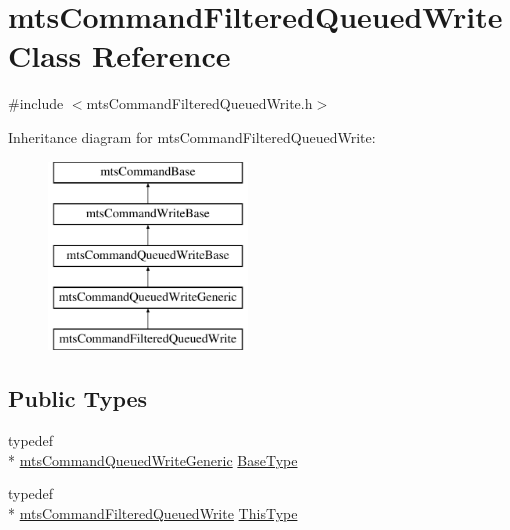 \hypertarget{classmts_command_filtered_queued_write}{\section{mts\-Command\-Filtered\-Queued\-Write Class Reference}
\label{classmts_command_filtered_queued_write}
}


{\ttfamily \#include $<$mts\-Command\-Filtered\-Queued\-Write.\-h$>$}

Inheritance diagram for mts\-Command\-Filtered\-Queued\-Write\-:\begin{figure}[H]
\begin{center}
\leavevmode
\includegraphics[height=5.000000cm]{d9/d52/classmts_command_filtered_queued_write}
\end{center}
\end{figure}
\subsection*{Public Types}
\begin{DoxyCompactItemize}
\item 
typedef \\*
\hyperlink{classmts_command_queued_write_generic}{mts\-Command\-Queued\-Write\-Generic} \hyperlink{classmts_command_filtered_queued_write_af9539c71a0b5815f2206641041dfdd60}{Base\-Type}
\item 
typedef \\*
\hyperlink{classmts_command_filtered_queued_write}{mts\-Command\-Filtered\-Queued\-Write} \hyperlink{classmts_command_filtered_queued_write_a155aa724cca736441779aaa34b7f5c6e}{This\-Type}
\end{DoxyCompactItemize}
